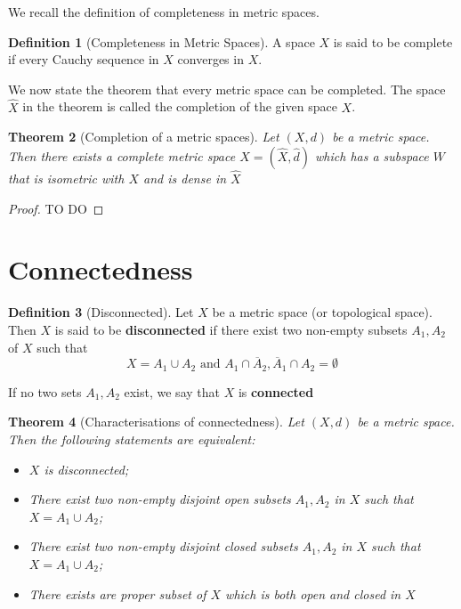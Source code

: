\documentclass[10pt, oneside, reqno]{amsart}
\theoremstyle{plain}%
\newtheorem{thm}{Theorem}[section]
\theoremstyle{definition}
\newtheorem{defn}[thm]{Definition}
\theoremstyle{remark}
\newcommand{\met}{(X,d)}
\newcommand{\ol}[1]{\overline{#1}}
\begin{document}
We recall the definition of completeness in metric spaces.

\begin{defn}[Completeness in Metric Spaces]
A space $X$ is said to be complete if every Cauchy sequence in $X$ converges in $X$.
\end{defn}

We now state the theorem that every metric space can be completed. The space $\hat{X}$ in the theorem is called the completion of the given space $X$.

\begin{thm}[Completion of a metric spaces]
    Let $\met$ be a metric space.  Then there exists a complete metric space $\hat{X} = (\hat{X}, \hat{d})$ which has a subspace $W$ that is isometric with $X$ and is dense in $\hat{X}$
\end{thm}

\begin{proof}
    TO DO
\end{proof}

\section{Connectedness} %
\label{sec:connectedness}


\begin{defn}[Disconnected]
Let $X$ be a metric space (or topological space). Then $X$ is said to be \textbf{disconnected} if there exist two non-empty subsets $A_1, A_2$ of $X$ such that \[
    X= A_1 \cup A_2 \text{ and } A_1 \cap \ol A_2 , \ol A_1 \cap A_2 = \emptyset
\]

If no two sets $A_1, A_2$ exist, we say that $X$ is \textbf{connected}
\end{defn}

\begin{thm}[Characterisations of connectedness]
    Let $\met$ be a metric space. Then the following statements are equivalent:
    \begin{itemize}
        \item $X$ is disconnected;
        \item There exist two non-empty disjoint open subsets $A_1, A_2$ in $X$ such that $X = A_1 \cup A_2$;
        \item There exist two non-empty disjoint closed subsets $A_1, A_2$ in $X$ such that $X = A_1 \cup A_2$; 
        \item There exists are proper subset of $X$ which is both open and closed in $X$
    \end{itemize}
\end{thm}
\end{document}
